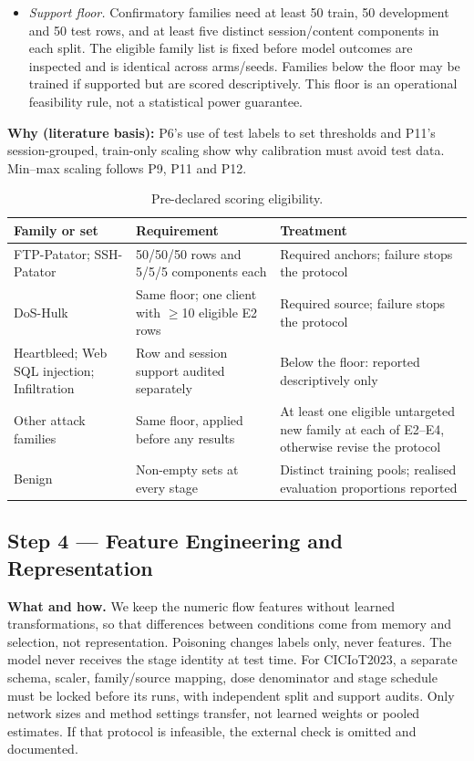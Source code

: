 \documentclass[10pt,a4paper]{article}
\newcommand{\why}[1]{\par\nopagebreak[4]\noindent\colorbox{black!5}{\parbox{\dimexpr\linewidth-2\fboxsep}{\small\textbf{Why (literature basis):} #1}}\par}
\begin{document}
\begin{itemize}
\item \emph{Support floor.} Confirmatory families need at least 50 train, 50 development and 50 test rows, and at least five distinct session/content components in each split. The eligible family list is fixed before model outcomes are inspected and is identical across arms/seeds. Families below the floor may be trained if supported but are scored descriptively. This floor is an operational feasibility rule, not a statistical power guarantee.
\end{itemize}

\why{P6's use of test labels to set thresholds and P11's session-grouped, train-only scaling show why calibration must avoid test data. Min--max scaling follows P9, P11 and P12.}

\begin{table}[H]
\centering\footnotesize
\caption{Pre-declared scoring eligibility.}
\label{tab:support}
\begin{tabularx}{\linewidth}{L{3.2cm}L{3.6cm}Y}
\toprule
Family or set & Requirement & Treatment\\
\midrule
FTP-Patator; SSH-Patator & 50/50/50 rows and 5/5/5 components each & Required anchors; failure stops the protocol\\
DoS-Hulk & Same floor; one client with $\ge$10 eligible E2 rows & Required source; failure stops the protocol\\
Heartbleed; Web SQL injection; Infiltration & Row and session support audited separately & Below the floor: reported descriptively only\\
Other attack families & Same floor, applied before any results & At least one eligible untargeted new family at each of E2--E4, otherwise revise the protocol\\
Benign & Non-empty sets at every stage & Distinct training pools; realised evaluation proportions reported\\
\bottomrule
\end{tabularx}
\end{table}

\subsection{Step 4 --- Feature Engineering and Representation}
\textbf{What and how.} We keep the numeric flow features without learned transformations, so that differences between conditions come from memory and selection, not representation. Poisoning changes labels only, never features. The model never receives the stage identity at test time. For CICIoT2023, a separate schema, scaler, family/source mapping, dose denominator and stage schedule must be locked before its runs, with independent split and support audits. Only network sizes and method settings transfer, not learned weights or pooled estimates. If that protocol is infeasible, the external check is omitted and documented.
\end{document}
